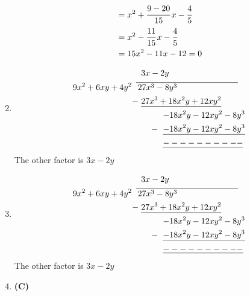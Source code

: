 \begin{multicols}{2}
\begin{enumerate}[label={\textbf{\arabic*.}}]
\begin{align*}
    &= x^2  +  \cfrac{9 - 20}{15}\,x -\cfrac{4}{5} \\
    &= x^2 - \cfrac{11}{15}\,x -\cfrac{4}{5} \\
    &= 15x^2 - 11x - 12 = 0
    \end{align*}
\item 
    \begin{align*}
    &\hspace{6pt} 3x - 2y \\
        9x^2 + 6xy + 4y^2 \hspace{5pt}  & \overline{\hspace{2pt} 27x^3 - 8y^3 \hspace{1in}} \\
      -\hspace{-3pt} & \hspace{6pt} \underline{27x^3 + 18x^2y + 12xy^2} \\
      & \hspace{32pt} {-18x^2y - 12xy^2 - 8y^3} \\
     -\hspace{-26pt} & \hspace{32pt} \underline{-18x^2y - 12xy^2 -8y^3}\\
     & \hspace{32pt} \underline{----------}
    \end{align*}
    The other factor is \(3x - 2y\)
\item 
    \begin{align*}
    &\hspace{6pt} 3x - 2y \\
        9x^2 + 6xy + 4y^2 \hspace{5pt}  & \overline{\hspace{2pt} 27x^3 - 8y^3 \hspace{1in}} \\
      -\hspace{-3pt} & \hspace{6pt} \underline{27x^3 + 18x^2y + 12xy^2} \\
      & \hspace{32pt} {-18x^2y - 12xy^2 - 8y^3} \\
     -\hspace{-26pt} & \hspace{32pt} \underline{-18x^2y - 12xy^2 -8y^3}\\
     & \hspace{32pt} \underline{----------}
    \end{align*}
    The other factor is $3x - 2y$
\item \textbf{(C)} \\

\end{enumerate}
\end{multicols}

